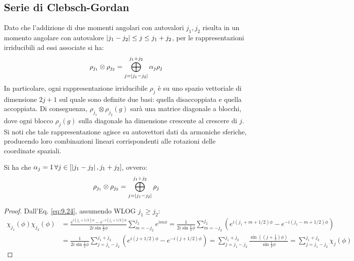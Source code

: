 \subsection{Serie di Clebsch-Gordan}

Dato che l'addizione di due momenti angolari con autovalori $ j_1,j_2 $ risulta in un momento angolare con autovalore $ \left\lvert j_1 - j_2\right\rvert \le j \le j_1 + j_2 $, per le rappresentazioni irriducibili ad essi associate si ha:
\begin{equation*}
	\rho_{j_1} \otimes \rho_{j_2} = \bigoplus_{j = \left\lvert j_1 - j_2\right\rvert}^{j_1 + j_2} \alpha_j \rho_j
\end{equation*}
In particolare, ogni rappresentazione irriducibile $ \rho_j $ è su uno spazio vettoriale di dimensione $ 2j + 1 $ sul quale sono definite due basi: quella disaccoppiata e quella accoppiata. Di conseguenza, $ \rho_{j_1} \otimes \rho_{j_2}(g) $ sarà una matrice diagonale a blocchi, dove ogni blocco $ \rho_j(g) $ sulla diagonale ha dimensione crescente al crescere di $ j $. Si noti che tale rappresentazione agisce su autovettori dati da armoniche sferiche, producendo loro combinazioni lineari corrispondenti alle rotazioni delle coordinate spaziali.

\begin{proposition}
	Si ha che $ \alpha_j = 1 \,\forall j \in [\left\lvert j_1 - j_2\right\rvert, j_1 + j_2] $, ovvero:
	\begin{equation}
		\rho_{j_1} \otimes \rho_{j_2} = \bigoplus_{j = \left\lvert j_1 - j_2\right\rvert}^{j_1 + j_2} \rho_j
		\label{eq:9.27}
	\end{equation}
\end{proposition}
\begin{proof}
	Dall'Eq. \ref{eq:9.24}, assumendo WLOG $ j_1 \ge j_2 $:
	\begin{equation*}
		\begin{split}
			\chi_{j_1}(\phi) \chi_{j_2}(\phi)
			&= \frac{e^{i (j_1 + 1/2) \phi} - e^{-i (j_1 + 1/2) \phi}}{2i \sin \frac{1}{2} \phi} \sum_{m = -j_2}^{j_2} e^{i m \phi} = \frac{1}{2i \sin \frac{1}{2} \phi} \sum_{m = -j_2}^{j_2} \left( e^{i (j_1 + m + 1/2) \phi} - e^{-i (j_1 - m + 1/2) \phi} \right) \\
			&= \frac{1}{2i \sin \frac{1}{2} \phi} \sum_{j = j_1 - j_2}^{j_1 + j_2} \left( e^{i (j + 1/2) \phi} - e^{-i (j + 1/2) \phi} \right) = \sum_{j = j_1 - j_2}^{j_1 + j_2} \frac{\sin \left( (j + \frac{1}{2}) \phi \right)}{\sin \frac{1}{2} \phi} = \sum_{j = j_1 - j_2}^{j_1 + j_2} \chi_j(\phi)
		\end{split}
	\end{equation*}
\end{proof}

